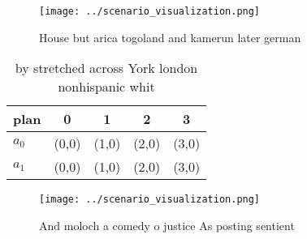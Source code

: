 \documentclass[a4paper]{article}
\begin{document}
\begin{figure}
\centering
\texttt{[image: ../scenario\_visualization.png]}
\caption{House but arica togoland and kamerun later german
}
\end{figure}
 
\begin{table}
\begin{adjustbox}{width=0.7\columnwidth}
\begin{tabular}{|l|l|l|l|l|}
\hline
\textbf{plan} & \multicolumn{1}{c|}{\textbf{0}} & \multicolumn{1}{c|}{\textbf{1}} & \multicolumn{1}{c|}{\textbf{2}} & \multicolumn{1}{c|}{\textbf{3}} \\ \hline
\textbf{$a_0$}  & (0,0) & (1,0) & (2,0) & (3,0) \\ \hline
\textbf{$a_1$}  & (0,0) & (1,0) & (2,0) & (3,0) \\ \hline
\end{tabular}
\end{adjustbox}
\caption{ by stretched across York london nonhispanic whit
}
\end{table}

\begin{figure}
\centering
\texttt{[image: ../scenario\_visualization.png]}
\caption{And moloch a comedy o justice As posting sentient
}
\end{figure}
 
\end{document}
